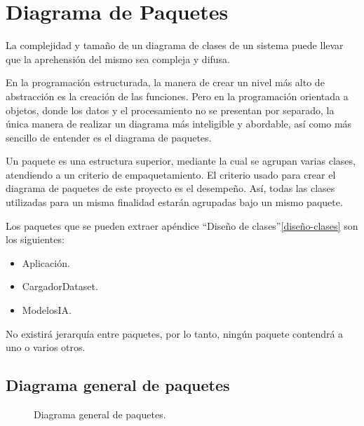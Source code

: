 
\chapter{Diagrama de Paquetes}

La complejidad y tamaño de un diagrama de clases de un sistema puede llevar que la aprehensión del mismo sea compleja y difusa.

En la programación estructurada, la manera de crear un nivel más alto de abstracción es la creación de las funciones. Pero en la programación orientada a objetos, donde los datos y el procesamiento no se presentan por separado, la única manera de realizar un diagrama más inteligible y abordable, así como más sencillo de entender es el diagrama de paquetes.

Un paquete es una estructura superior, mediante la cual se agrupan varias clases, atendiendo a un criterio de empaquetamiento. El criterio usado para crear el diagrama de paquetes de este proyecto es el desempeño. Así, todas las clases utilizadas para un misma finalidad estarán agrupadas bajo un mismo paquete.

Los paquetes que se pueden extraer apéndice ``Diseño de clases''\ref{diseño-clases} son los siguientes:

\begin{itemize}
    \item Aplicación.
    \item CargadorDataset.
    \item ModelosIA.
\end{itemize}

No existirá jerarquía entre paquetes, por lo tanto, ningún paquete contendrá a uno o varios otros.

\section{Diagrama general de paquetes}

\begin{figure}[H]
  \centering
  
  \caption{Diagrama general de paquetes.}
\end{figure}
